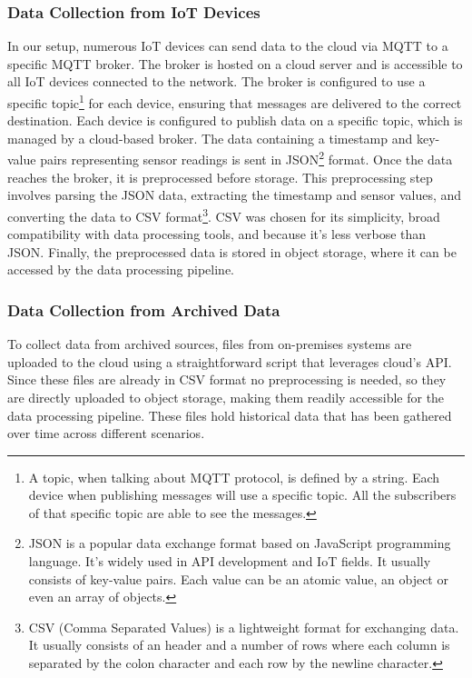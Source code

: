 \subsubsection{Data Collection from IoT Devices}
In our setup, numerous IoT devices can send data to the cloud via MQTT to a specific MQTT broker. The broker is hosted on a cloud server and is accessible to all IoT devices connected to the network. The broker is configured to use a specific topic\footnote{A topic, when talking about MQTT protocol, is defined by a string. Each device when publishing messages will use a specific topic. All the subscribers of that specific topic are able to see the messages.} for each device, ensuring that messages are delivered to the correct destination. Each device is configured to publish data on a specific topic, which is managed by a cloud-based broker. The data containing a timestamp and key-value pairs representing sensor readings is sent in JSON\footnote{JSON is a popular data exchange format based on JavaScript programming language. It's widely used in API development and IoT fields. It usually consists of key-value pairs. Each value can be an atomic value, an object or even an array of objects.} format. Once the data reaches the broker, it is preprocessed before storage. This preprocessing step involves parsing the JSON data, extracting the timestamp and sensor values, and converting the data to CSV format\footnote{CSV (Comma Separated Values) is a lightweight format for exchanging data. It usually consists of an header and a number of rows where each column is separated by the colon character and each row by the newline character.}. CSV was chosen for its simplicity, broad compatibility with data processing tools, and because it's less verbose than JSON. Finally, the preprocessed data is stored in object storage, where it can be accessed by the data processing pipeline.


\subsubsection{Data Collection from Archived Data}
To collect data from archived sources, files from on-premises systems are uploaded to the cloud using a straightforward script that leverages cloud's API. Since these files are already in CSV format no preprocessing is needed, so they are directly uploaded to object storage, making them readily accessible for the data processing pipeline. These files hold historical data that has been gathered over time across different scenarios.

